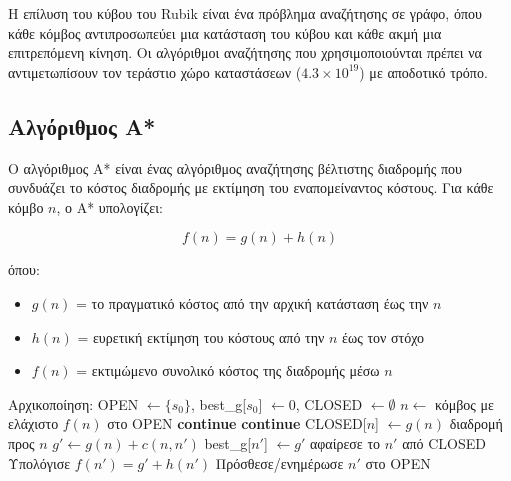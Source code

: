 Η επίλυση του κύβου του Rubik είναι ένα πρόβλημα αναζήτησης σε γράφο, όπου κάθε κόμβος αντιπροσωπεύει μια κατάσταση του κύβου και κάθε ακμή μια επιτρεπόμενη κίνηση. Οι αλγόριθμοι αναζήτησης που χρησιμοποιούνται πρέπει να αντιμετωπίσουν τον τεράστιο χώρο καταστάσεων ($4.3 \times 10^{19}$) με αποδοτικό τρόπο.

\subsection{Αλγόριθμος A*}
\label{subsec:a_star}

Ο αλγόριθμος A* \cite{hart1968formal} είναι ένας αλγόριθμος αναζήτησης βέλτιστης διαδρομής που συνδυάζει το κόστος διαδρομής με εκτίμηση του εναπομείναντος κόστους. Για κάθε κόμβο $n$, ο A* υπολογίζει:

\begin{equation}
    f(n) = g(n) + h(n)
\end{equation}

όπου:
\begin{itemize}
    \item $g(n)$ = το πραγματικό κόστος από την αρχική κατάσταση έως την $n$
    \item $h(n)$ = ευρετική εκτίμηση του κόστους από την $n$ έως τον στόχο
    \item $f(n)$ = εκτιμώμενο συνολικό κόστος της διαδρομής μέσω $n$
\end{itemize}

\begin{algorithm}[H]
\caption{Αλγόριθμος A*}
\begin{algorithmic}[1]
\State Αρχικοποίηση: OPEN $\gets \{s_0\}$, best\_g[$s_0$] $\gets 0$, CLOSED $\gets \emptyset$
    \State $n \gets$ κόμβος με ελάχιστο $f(n)$ στο OPEN
        \State \textbf{continue} 
    \EndIf
        \State \textbf{continue}
    \EndIf
    \State CLOSED[$n$] $\gets g(n)$
        \State \Return διαδρομή προς $n$
    \EndIf
        \State $g' \gets g(n) + c(n,n')$
            \State best\_g[$n'$] $\gets g'$
                \State αφαίρεσε το $n'$ από CLOSED 
            \EndIf
            \State Υπολόγισε $f(n') = g' + h(n')$
            \State Πρόσθεσε/ενημέρωσε $n'$ στο OPEN
        \EndIf
    \EndFor
\EndWhile
\end{algorithmic}
\end{algorithm}

